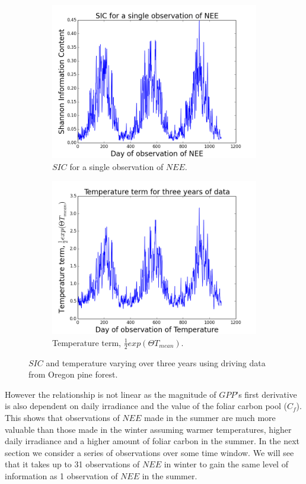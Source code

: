 \documentclass[11pt]{article}
\begin{document}
\begin{figure}[h]
\centering
\begin{subfigure}{.5\textwidth}
  \centering
  \includegraphics[width=.9\linewidth]{SIC1Obs_0_1095.png}
  \caption{$SIC$ for a single observation of $NEE$.}
  \label{fig:sub1}
\end{subfigure}%
\begin{subfigure}{.5\textwidth}
  \centering
  \includegraphics[width=.9\linewidth]{Temp_0_1095.png}
  \caption{Temperature term, $\frac{1}{2}exp(\Theta  T_{mean})$.}
  \label{fig:sub2}
\end{subfigure}
\caption{$SIC$ and temperature varying over three years using driving data from Oregon pine forest.}
\label{fig:SICNEET}
\end{figure}
However the relationship is not linear as the magnitude of $GPP$'s first derivative is also dependent on daily irradiance and the value of the foliar carbon pool ($C_f$). This shows that observations of $NEE$ made in the summer are much more valuable than those made in the winter assuming warmer temperatures, higher daily irradiance and a higher amount of foliar carbon in the summer. In the next section we consider a series of observations over some time window. We will see that it takes up to 31 observations of $NEE$ in winter to gain the same level of information as 1 observation of $NEE$ in the summer.
\end{document}
